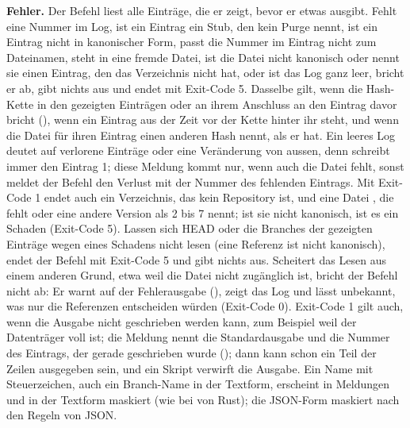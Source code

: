 {\bf Fehler.} Der Befehl liest alle Einträge, die er zeigt, bevor er etwas ausgibt.
Fehlt eine Nummer im Log, ist ein Eintrag ein Stub, den kein Purge nennt,
ist ein Eintrag nicht in kanonischer Form, passt die Nummer
im Eintrag nicht zum Dateinamen, steht in  eine fremde Datei,
ist die Datei  nicht kanonisch oder nennt sie einen Eintrag, den das
Verzeichnis nicht hat, oder ist das Log ganz leer, bricht er ab, gibt nichts aus und
endet mit Exit-Code 5.
Dasselbe gilt, wenn die Hash-Kette in den gezeigten Einträgen oder an ihrem Anschluss an den
Eintrag davor bricht (), wenn ein
Eintrag aus der Zeit vor der Kette hinter ihr steht, und wenn die Datei 
für ihren Eintrag einen anderen Hash nennt, als er hat.
Ein leeres Log deutet auf verlorene Einträge oder eine Veränderung von aussen,
denn  schreibt immer den Eintrag 1; diese Meldung kommt nur,
wenn auch die Datei  fehlt, sonst meldet der Befehl den Verlust mit
der Nummer des fehlenden Eintrags. Mit Exit-Code 1 endet auch ein Verzeichnis,
das kein Repository ist, und eine Datei , die fehlt oder eine andere Version
als 2 bis 7 nennt; ist sie nicht kanonisch, ist es ein Schaden (Exit-Code 5).
Lassen sich HEAD oder die Branches der gezeigten Einträge wegen eines Schadens nicht lesen
(eine Referenz ist nicht kanonisch), endet der Befehl mit Exit-Code 5 und gibt nichts aus.
Scheitert das Lesen aus einem anderen Grund, etwa weil die Datei nicht zugänglich ist,
bricht der Befehl nicht ab: Er warnt auf der Fehlerausgabe
(), zeigt das Log und lässt unbekannt, was nur die Referenzen
entscheiden würden (Exit-Code 0). Exit-Code 1 gilt auch, wenn die Ausgabe nicht
geschrieben werden kann, zum Beispiel weil der Datenträger voll ist; die Meldung
nennt die Standardausgabe und die Nummer des Eintrags, der gerade geschrieben
wurde (); dann kann schon
ein Teil der Zeilen ausgegeben sein, und ein Skript verwirft die Ausgabe.
Ein Name mit Steuerzeichen, auch ein Branch-Name in der Textform, erscheint
in Meldungen und in der Textform maskiert (wie bei  von Rust);
die JSON-Form maskiert nach den Regeln von JSON.

